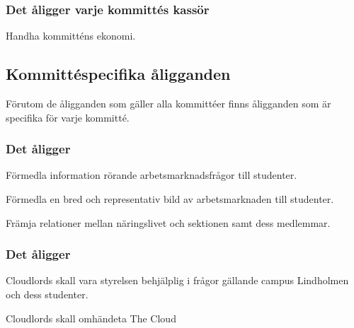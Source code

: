 \subsubsection{Det åligger varje kommittés kassör}
\begin{att}
	\item Handha kommitténs ekonomi.
\end{att}

\subsection{Kommittéspecifika åligganden}
Förutom de åligganden som gäller alla kommittéer finns åligganden som är specifika för varje kommitté.

\subsubsection{Det åligger \ARMIT{}}
\begin{att}
	\item Förmedla information rörande arbetsmarknadsfrågor till studenter.
	\item Förmedla en bred och representativ bild av arbetsmarknaden till studenter.
	\item Främja relationer mellan näringslivet och sektionen samt dess medlemmar.
\end{att}

\subsubsection{Det åligger \CLOUDLORDS}
\begin{att}
	\item Cloudlords skall vara styrelsen behjälplig i frågor gällande campus Lindholmen och dess studenter.
    \item Cloudlords skall omhändeta The Cloud
\end{att}

